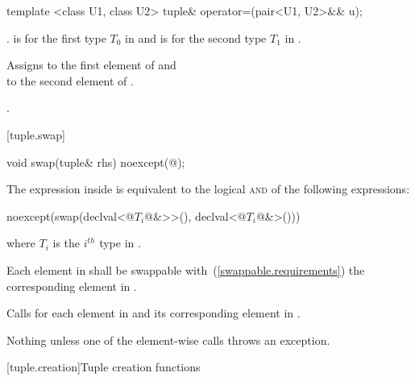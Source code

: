 %
%
%
\begin{itemdecl}
template <class U1, class U2> tuple& operator=(pair<U1, U2>&& u);
\end{itemdecl}

\begin{itemdescr}
\pnum
\requires {}.
 is  for the first type $T_0$ in
 and  is  for the second
type $T_1$ in .

\pnum
\effects Assigns  to the first
element of  and\\  to the
second element of .

\pnum
\returns {}.
\end{itemdescr}

[tuple.swap]{}

\begin{itemdecl}
void swap(tuple& rhs) noexcept(@\seebelow@);
\end{itemdecl}

\begin{itemdescr}
\pnum
\remark The expression inside  is equivalent to the logical
\textsc{and} of the following expressions:

\begin{codeblock}
noexcept(swap(declval<@$T_i$@&>>(), declval<@$T_i$@&>()))
\end{codeblock}

where $T_i$ is the $i^{th}$ type in .

\pnum
\requires
Each element in  shall be swappable with~(\ref{swappable.requirements})
the corresponding element in .

\pnum
\effects Calls  for each element in  and its
corresponding element in .

\pnum
\throws Nothing unless one of the element-wise  calls throws an exception.
\end{itemdescr}

[tuple.creation]{Tuple creation functions}

